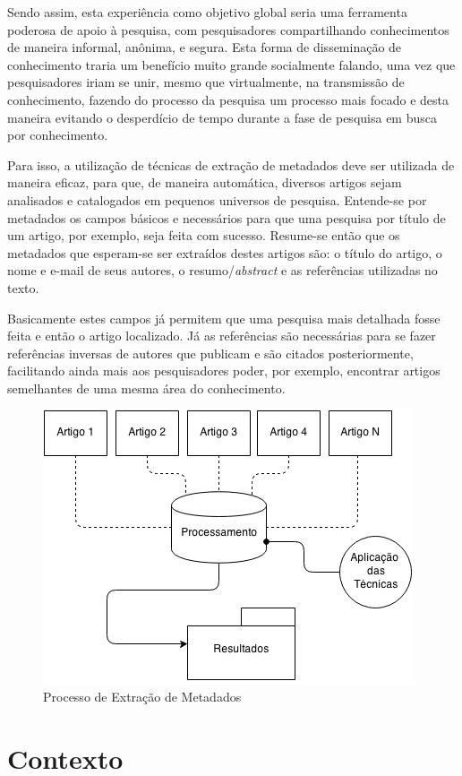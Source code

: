 Sendo assim, esta experiência como objetivo global seria uma ferramenta poderosa de apoio à pesquisa, com pesquisadores compartilhando conhecimentos de maneira informal, anônima, e segura. Esta forma de disseminação de conhecimento traria um benefício muito grande socialmente falando, uma vez que pesquisadores iriam se unir, mesmo que virtualmente, na transmissão de conhecimento, fazendo do processo da pesquisa um processo mais focado e desta maneira evitando o desperdício de tempo durante a fase de pesquisa em busca por conhecimento.

Para isso, a utilização de técnicas de extração de metadados deve ser utilizada de maneira eficaz, para que, de maneira automática, diversos artigos sejam analisados e catalogados em pequenos universos de pesquisa. Entende-se por metadados os campos básicos e necessários para que uma pesquisa por título de um artigo, por exemplo, seja feita com sucesso. Resume-se então que os metadados que esperam-se ser extraídos destes artigos são: o título do artigo, o nome e e-mail de seus autores, o resumo/\textit{abstract} e as referências utilizadas no texto.

Basicamente estes campos já permitem que uma pesquisa mais detalhada fosse feita e então o artigo localizado. Já as referências são necessárias para se fazer referências inversas de autores que publicam e são citados posteriormente, facilitando ainda mais aos pesquisadores poder, por exemplo, encontrar artigos semelhantes de uma mesma área do conhecimento.

\begin{figure}
\centering
\caption{Processo de Extração de Metadados}
\label{fig:introducao}
\includegraphics[width=0.7\linewidth]{./assets/introducao}
\end{figure}

\section{Contexto}

